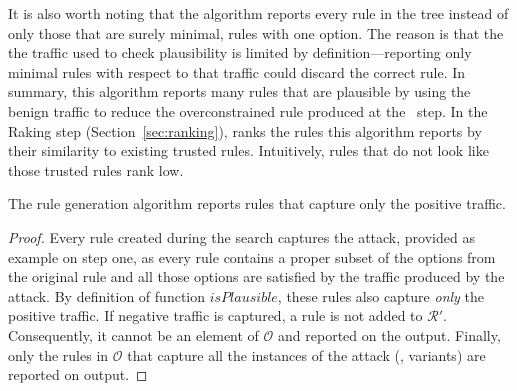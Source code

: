 \documentclass[sigconf,review, anonymous]{acmart}
\begin{document}
It is also worth noting that the algorithm reports every rule in the
tree instead of only those that are surely minimal, \ie{} rules with
one option. The reason is that the the traffic used to check
plausibility is limited by definition---reporting only minimal rules
with respect to that traffic could discard the correct rule. In
summary, this algorithm reports many rules that are plausible by using
the benign traffic to reduce the overconstrained rule produced at the
\reveng\ step. In the Raking step (Section~\ref{sec:ranking}),
\tname{} ranks the rules this algorithm reports by their similarity to
existing trusted rules. Intuitively, rules that do not look like those
trusted rules rank low.

\begin{proposition}
  \vspace{-1ex}  
  The rule generation algorithm reports rules that capture only the
  positive traffic.
\end{proposition}
\begin{proof}
  \vspace{-1.5ex} Every rule created during the search captures the
  attack, provided as example on step one, as every rule contains a
  proper subset of the options from the original rule and all those
  options are satisfied by the traffic produced by the attack. By
  definition of function $\mathit{isPlausible}$, these rules also
  capture \emph{only} the positive traffic. If negative traffic is
  captured, a rule is not added to $\mathcal R'$. Consequently, it
  cannot be an element of $\mathcal O$ and reported on the
  output. Finally, only the rules in $\mathcal O$ that capture all the
  instances of the attack (\ie{}, variants) are reported on output.
  \vspace{-1ex}    
\end{proof}


\end{document}
